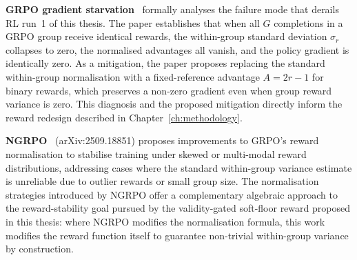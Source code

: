 \textbf{GRPO gradient starvation}~\cite{grpo-starvation} formally analyses the
failure mode that derails RL run~1 of this thesis.
The paper establishes that when all $G$ completions in a GRPO group receive
identical rewards, the within-group standard deviation $\sigma_r$ collapses to
zero, the normalised advantages all vanish, and the policy gradient is
identically zero.
As a mitigation, the paper proposes replacing the standard within-group
normalisation with a fixed-reference advantage $A = 2r - 1$ for binary rewards,
which preserves a non-zero gradient even when group reward variance is zero.
This diagnosis and the proposed mitigation directly inform the reward redesign
described in Chapter~\ref{ch:methodology}.

\textbf{NGRPO}~\cite{ngrpo} (arXiv:2509.18851) proposes improvements to GRPO's
reward normalisation to stabilise training under skewed or multi-modal reward
distributions, addressing cases where the standard within-group variance estimate
is unreliable due to outlier rewards or small group size.
The normalisation strategies introduced by NGRPO offer a complementary algebraic
approach to the reward-stability goal pursued by the validity-gated soft-floor
reward proposed in this thesis: where NGRPO modifies the normalisation formula,
this work modifies the reward function itself to guarantee non-trivial within-group
variance by construction.
